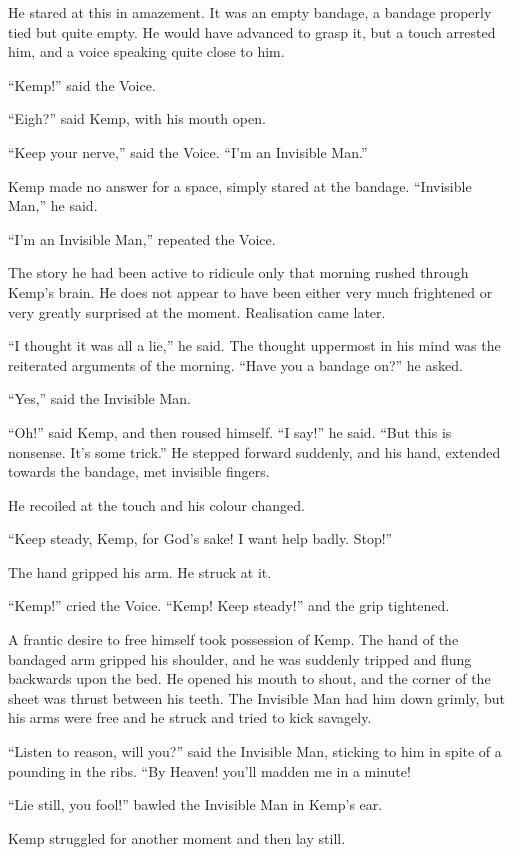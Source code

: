 He stared at this in amazement. It was an empty bandage, a bandage properly tied but quite empty. He would have advanced to grasp it, but a touch arrested him, and a voice speaking quite close to him.

“Kemp!” said the Voice.

“Eigh?” said Kemp, with his mouth open.

“Keep your nerve,” said the Voice. “I’m an Invisible Man.”

Kemp made no answer for a space, simply stared at the bandage. “Invisible Man,” he said.

“I’m an Invisible Man,” repeated the Voice.

The story he had been active to ridicule only that morning rushed through Kemp’s brain. He does not appear to have been either very much frightened or very greatly surprised at the moment. Realisation came later.

“I thought it was all a lie,” he said. The thought uppermost in his mind was the reiterated arguments of the morning. “Have you a bandage on?” he asked.

“Yes,” said the Invisible Man.

“Oh!” said Kemp, and then roused himself. “I say!” he said. “But this is nonsense. It’s some trick.” He stepped forward suddenly, and his hand, extended towards the bandage, met invisible fingers.

He recoiled at the touch and his colour changed.

“Keep steady, Kemp, for God’s sake! I want help badly. Stop!”

The hand gripped his arm. He struck at it.

“Kemp!” cried the Voice. “Kemp! Keep steady!” and the grip tightened.

A frantic desire to free himself took possession of Kemp. The hand of the bandaged arm gripped his shoulder, and he was suddenly tripped and flung backwards upon the bed. He opened his mouth to shout, and the corner of the sheet was thrust between his teeth. The Invisible Man had him down grimly, but his arms were free and he struck and tried to kick savagely.

“Listen to reason, will you?” said the Invisible Man, sticking to him in spite of a pounding in the ribs. “By Heaven! you’ll madden me in a minute!

“Lie still, you fool!” bawled the Invisible Man in Kemp’s ear.

Kemp struggled for another moment and then lay still.

